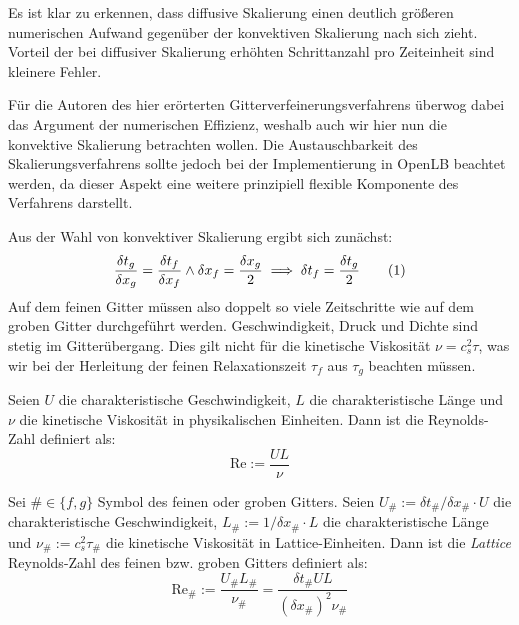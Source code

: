 Es ist klar zu erkennen, dass diffusive Skalierung einen deutlich größeren numerischen Aufwand gegenüber der konvektiven Skalierung nach sich zieht. Vorteil der bei diffusiver Skalierung erhöhten Schrittanzahl pro Zeiteinheit sind kleinere Fehler.

Für die Autoren des hier erörterten Gitterverfeinerungsverfahrens überwog dabei das Argument der numerischen Effizienz, weshalb auch wir hier nun die konvektive Skalierung betrachten wollen. Die Austauschbarkeit des Skalierungsverfahrens sollte jedoch bei der Implementierung in OpenLB beachtet werden, da dieser Aspekt eine weitere prinzipiell flexible Komponente des Verfahrens darstellt.

\bigskip

Aus der Wahl von konvektiver Skalierung ergibt sich zunächst:
\[\frac{\delta t_g}{\delta x_g} = \frac{\delta t_f}{\delta x_f} \land \delta x_f = \frac{\delta x_g}{2} \implies \delta t_f = \frac{\delta t_g}{2} \numberthis\label{eq:gridTime}\]
Auf dem feinen Gitter müssen also doppelt so viele Zeitschritte wie auf dem groben Gitter durchgeführt werden. Geschwindigkeit, Druck und Dichte sind stetig im Gitterübergang. Dies gilt nicht für die kinetische Viskosität \(\nu = c_s^2 \tau\), was wir bei der Herleitung der feinen Relaxationszeit \(\tau_f\) aus \(\tau_g\) beachten müssen.

\begin{Definition}
\label{def:PhysicalReynoldsNumber}
Seien \(U\) die charakteristische Geschwindigkeit, \(L\) die charakteristische Länge und \(\nu\) die kinetische Viskosität in physikalischen Einheiten. Dann ist die Reynolds-Zahl definiert als: \[\text{Re} := \frac{U L}{\nu}\]
\end{Definition}

\begin{Definition}
\label{def:LatticeReynoldsNumber}
Sei \(\# \in \{f, g\}\) Symbol des feinen oder groben Gitters.
Seien \(U_\# := \delta t_\# / \delta x_\# \cdot U\) die charakteristische Geschwindigkeit, \(L_\# := 1 / \delta x_\# \cdot L\) die charakteristische Länge und \(\nu_\# := c_s^2 \tau_\#\) die kinetische Viskosität in Lattice-Einheiten. Dann ist die \emph{Lattice} Reynolds-Zahl des feinen bzw. groben Gitters definiert als: \[ \text{Re}_\# := \frac{U_\# L_\#}{\nu_\#} = \frac{\delta t_\# U L}{(\delta x_\#)^2 \nu_\#} \]
\end{Definition}

